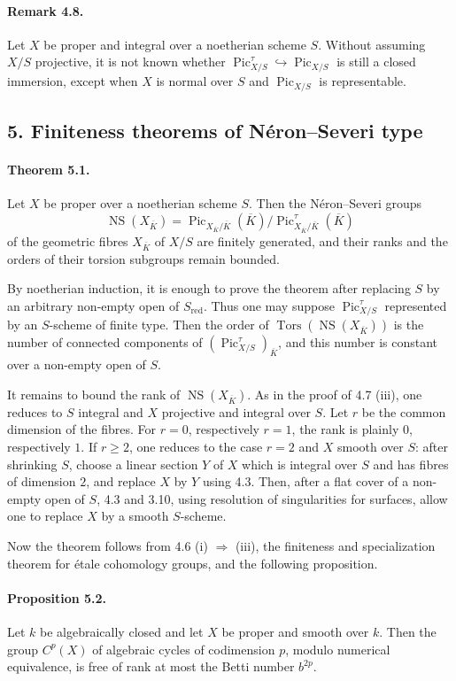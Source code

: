 \documentclass[12pt]{article}
\newcommand{\Pic}{\operatorname{Pic}}
\newcommand{\NS}{\operatorname{NS}}
\newcommand{\Tors}{\operatorname{Tors}}
\newcommand{\ov}[1]{\overline{#1}}
\newcommand{\red}{\mathrm{red}}
\begin{document}
\paragraph{Remark 4.8.}
Let $X$ be proper and integral over a noetherian scheme $S$. Without assuming $X/S$ projective, it is not known whether $\Pic^\tau_{X/S}\hookrightarrow \Pic_{X/S}$ is still a closed immersion, except when $X$ is normal over $S$ and $\Pic_{X/S}$ is representable.

\subsection*{5. Finiteness theorems of Néron--Severi type}

\paragraph{Theorem 5.1.}
Let $X$ be proper over a noetherian scheme $S$. Then the Néron--Severi groups
\[
\NS(X_{\ov K})=
\Pic_{X_{\ov K}/\ov K}(\ov K)/\Pic^\tau_{X_{\ov K}/\ov K}(\ov K)
\]
of the geometric fibres $X_{\ov K}$ of $X/S$ are finitely generated, and their ranks and the orders of their torsion subgroups remain bounded.

By noetherian induction, it is enough to prove the theorem after replacing $S$ by an arbitrary non-empty open of $S_{\red}$. Thus one may suppose $\Pic^\tau_{X/S}$ represented by an $S$-scheme of finite type. Then the order of $\Tors(\NS(X_{\ov K}))$ is the number of connected components of $(\Pic^\tau_{X/S})_{\ov K}$, and this number is constant over a non-empty open of $S$.

It remains to bound the rank of $\NS(X_{\ov K})$. As in the proof of 4.7 (iii), one reduces to $S$ integral and $X$ projective and integral over $S$. Let $r$ be the common dimension of the fibres. For $r=0$, respectively $r=1$, the rank is plainly $0$, respectively $1$. If $r\geq 2$, one reduces to the case $r=2$ and $X$ smooth over $S$: after shrinking $S$, choose a linear section $Y$ of $X$ which is integral over $S$ and has fibres of dimension $2$, and replace $X$ by $Y$ using 4.3. Then, after a flat cover of a non-empty open of $S$, 4.3 and 3.10, using resolution of singularities for surfaces, allow one to replace $X$ by a smooth $S$-scheme.

Now the theorem follows from 4.6 (i) $\Rightarrow$ (iii), the finiteness and specialization theorem for étale cohomology groups, and the following proposition.

\paragraph{Proposition 5.2.}
Let $k$ be algebraically closed and let $X$ be proper and smooth over $k$. Then the group $C^p(X)$ of algebraic cycles of codimension $p$, modulo numerical equivalence, is free of rank at most the Betti number $b^{2p}$.
\end{document}
